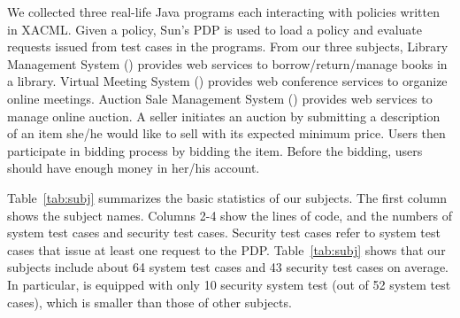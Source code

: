 We collected three real-life Java programs \cite{mouelhi09:tranforming} each
interacting with policies written in XACML.
Given a policy, 
Sun's PDP \cite{sun05:xacml} is
used to load a policy and evaluate requests issued from test cases in the programs.
From our three subjects,
Library Management System () provides web services to borrow/return/manage books in a library.
Virtual Meeting System () provides web conference services to organize online meetings.
Auction Sale Management System () provides web services to manage online auction.
A seller initiates an auction by submitting a description of an item she/he would like to sell with its expected minimum price. Users then participate in bidding process by
bidding the item. Before the bidding, users should have enough money in her/his account.


Table~\ref{tab:subj} summarizes the basic statistics of our subjects.
The first column shows the subject names.
Columns 2-4 show the lines of code, and the numbers of system test cases and security test cases.
Security test cases refer to system test cases that issue at least one request to the PDP.
Table~\ref{tab:subj} shows that our subjects include about 64 system test cases and 43 security
test cases on average.
In particular,  is equipped with only 10 security system test (out of 52 system test cases), which
is smaller than those of other subjects.


